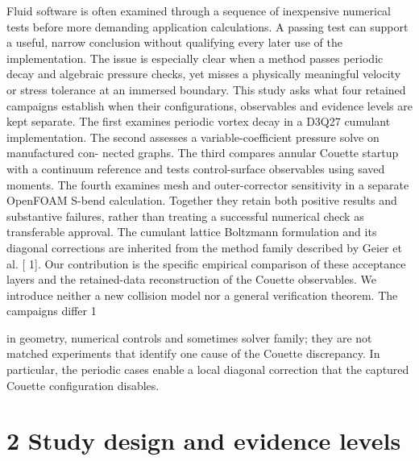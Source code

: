 \documentclass[11pt]{article}
\begin{document}
Fluid software is often examined through a sequence of inexpensive numerical tests before more
demanding application calculations. A passing test can support a useful, narrow conclusion without
qualifying every later use of the implementation. The issue is especially clear when a method passes
periodic decay and algebraic pressure checks, yet misses a physically meaningful velocity or stress
tolerance at an immersed boundary.
This study asks what four retained campaigns establish when their configurations, observables and
evidence levels are kept separate. The first examines periodic vortex decay in a D3Q27 cumulant
implementation. The second assesses a variable-coefficient pressure solve on manufactured con-
nected graphs. The third compares annular Couette startup with a continuum reference and tests
control-surface observables using saved moments. The fourth examines mesh and outer-corrector
sensitivity in a separate OpenFOAM S-bend calculation. Together they retain both positive results
and substantive failures, rather than treating a successful numerical check as transferable approval.
The cumulant lattice Boltzmann formulation and its diagonal corrections are inherited from the
method family described by Geier et al. [ 1]. Our contribution is the specific empirical comparison
of these acceptance layers and the retained-data reconstruction of the Couette observables. We
introduce neither a new collision model nor a general verification theorem. The campaigns differ
1

in geometry, numerical controls and sometimes solver family; they are not matched experiments
that identify one cause of the Couette discrepancy. In particular, the periodic cases enable a local
diagonal correction that the captured Couette configuration disables.

\section*{2 Study design and evidence levels}
\end{document}
